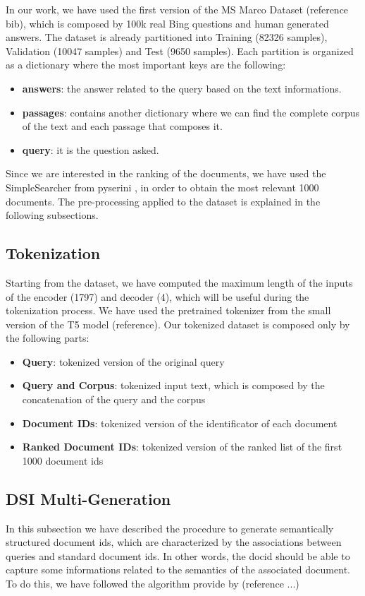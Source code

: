 In our work, we have used the first version of the MS Marco Dataset (reference bib), which is composed by 100k real Bing questions and human generated answers. The dataset is already partitioned into Training (82326 samples), Validation (10047 samples) and Test (9650 samples). Each partition is organized as a dictionary where the most important keys are the following:
\begin{itemize}
    \item \textbf{answers}: the answer related to the query based on the text informations.
    \item \textbf{passages}: contains another dictionary where we can find the complete corpus of the text and each passage that composes it.
    \item \textbf{query}: it is the question asked.
\end{itemize}
Since we are interested in the ranking of the documents, we have used the SimpleSearcher from pyserini \cite{pyserini}, in order to obtain the most relevant 1000 documents. 
The pre-processing applied to the dataset is explained in the following subsections.
\subsection{Tokenization}
Starting from the dataset, we have computed the maximum length of the inputs of the encoder (1797) and decoder (4), which will be useful during the tokenization process. We have used the pretrained tokenizer from the small version of the T5 model (reference). Our tokenized dataset is composed only by the following parts:
\begin{itemize}
    \item \textbf{Query}: tokenized version of the original query
    \item \textbf{Query and Corpus}: tokenized input text, which is composed by the concatenation of the query and the corpus
    \item \textbf{Document IDs}: tokenized version of the identificator of each document
    \item \textbf{Ranked Document IDs}: tokenized version of the ranked list of the first 1000 document ids
\end{itemize}
\subsection{DSI Multi-Generation}
In this subsection we have described the procedure to generate semantically structured document ids, which are characterized by the associations between queries and standard document ids. In other words, the docid should be able to capture some informations related to the semantics of the associated document. To do this, we have followed the algorithm provide by (reference ...)

